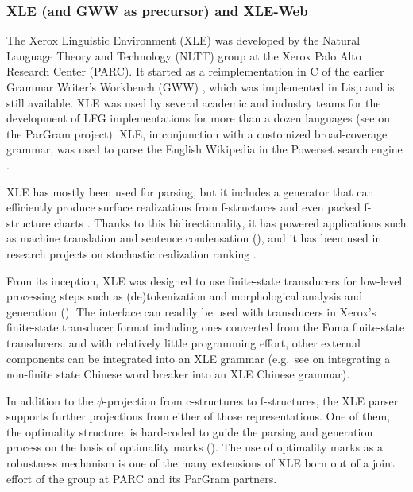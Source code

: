 \documentclass[output=paper,hidelinks]{langscibook}
\begin{document}
\subsubsection{XLE (and GWW as precursor) and XLE-Web}\label{sec:ImpApp:XLE}

The Xerox Linguistic Environment (XLE) was developed by the Natural Language Theory and Technology (NLTT) group at the Xerox Palo Alto Research Center (PARC). It started as a reimplementation in C of the earlier Grammar Writer's Workbench (GWW) \citep{kaplanmaxwell96}, which was implemented in Lisp and is still available.  XLE was used by several academic and industry teams for the development of LFG implementations for more than a dozen languages (see  on the ParGram project). XLE, in conjunction with a customized broad-coverage grammar, was used to parse the English Wikipedia in the Powerset search engine \citep{kaplan09}.

XLE has mostly been used for parsing, but it includes a generator that can efficiently produce surface realizations from f-structures and even packed f-structure charts \citep{Maxwell06}. Thanks to this bidirectionality, it has powered applications such as machine translation and sentence condensation (), and it has been used in research projects on stochastic realization ranking \citep{CahillForst}.

From its inception, XLE was designed to use finite-state transducers for low-level processing steps such as (de)tokenization and morphological analysis and generation (). The interface can readily be used with transducers in Xerox's finite-state transducer format including ones converted from the Foma finite-state transducers, and with relatively little programming effort, other external components  can  be integrated into an XLE grammar (e.g.\ see \cite{Fang-King-GEAF07} on integrating a non-finite state Chinese word breaker into an XLE Chinese grammar).

In addition to the $\phi$-projection from c-structures to f-structures, the XLE parser supports further projections from either of those representations. One of them, the optimality  structure, is hard-coded to guide the parsing and generation process on the basis of optimality marks (). The use of optimality marks as a robustness mechanism is one of
the many extensions of XLE born out of a joint effort of the group at PARC and its ParGram partners.
\end{document}
